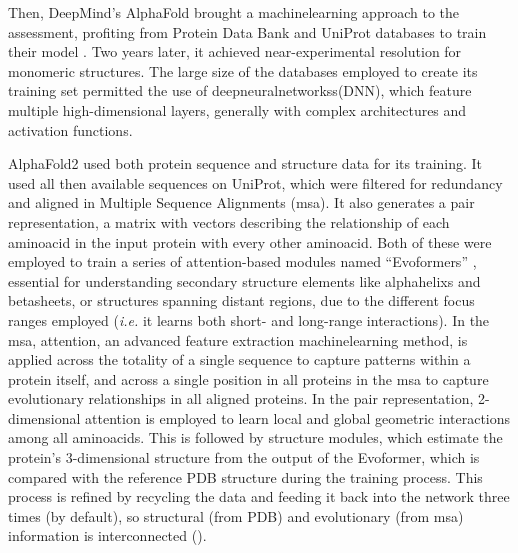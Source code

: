 Then, DeepMind's AlphaFold brought a \gls{machinelearning} approach to the assessment, profiting from Protein Data Bank and UniProt databases to train their model \cite{senior_improved_2020}. Two years later, it achieved near-experimental resolution \cite{jumper_highly_2021} for monomeric structures. The large size of the databases employed to create its training set permitted the use of \glspl{deepneuralnetworks}(DNN), which feature multiple high-dimensional layers, generally with complex architectures and activation functions.


AlphaFold2 used both protein sequence and structure data for its training. It used all then available sequences on UniProt, which were filtered for redundancy and aligned in Multiple Sequence Alignments (\gls{msa}). It also generates a pair representation, a matrix with vectors describing the relationship of each \gls{aminoacid} in the input protein with every other \gls{aminoacid}. Both of these were employed to train a series of \gls{attention}-based modules named ``Evoformers'' \cite{vaswani_attention_2023,jumper_highly_2021}, essential for understanding secondary structure elements like \glspl{alphahelix} and \glspl{betasheet}, or structures spanning distant regions, due to the different focus ranges employed (\textit{i.e.} it learns both short- and long-range interactions). In the \gls{msa}, \gls{attention}, an 
advanced feature extraction \gls{machinelearning} method, is applied across the totality of a single sequence to capture patterns within a protein itself, and across a single position in all proteins in the \gls{msa} to capture evolutionary relationships in all aligned proteins. In the pair representation, 2-dimensional \gls{attention} is employed to learn local and global geometric interactions among all \glspl{aminoacid}. This is followed by structure modules, which estimate the protein's 3-dimensional structure from the output of the Evoformer, which is compared with the reference PDB structure during the training process. This process is refined by recycling the data and feeding it back into the network three times (by default), so structural (from PDB) and evolutionary (from \gls{msa}) information is interconnected \cite{jumper_highly_2021} ().

